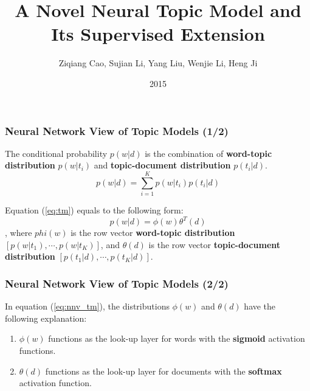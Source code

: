 \documentclass{beamer}
\begin{document}
\title{A Novel Neural Topic Model and Its Supervised Extension}
\author{Ziqiang Cao, Sujian Li, Yang Liu, Wenjie Li, Heng Ji}
\date{2015}
\maketitle

\begin{frame}
\frametitle{Neural Network View of Topic Models (1/2)}

The conditional probability \(p(w|d)\) is the combination of \textbf{word-topic distribution} \(p(w|t_i)\) and \textbf{topic-document distribution} \(p(t_i|d)\).
\begin{equation}
\label{eq:tm}
	p(w|d)=\sum_{i=1}^{K} p(w|t_i)p(t_i|d)
\end{equation}

Equation (\ref{eq:tm}) equals to the following form:
\begin{equation}
\label{eq:nnv_tm}
p(w|d)=\phi(w) \theta^T(d)
\end{equation}
, where \(phi(w)\) is the row vector \textbf{word-topic distribution} \([p(w|t_1), \cdots, p(w|t_K)]\), and \(\theta(d)\) is the row vector \textbf{topic-document distribution} \([p(t_1|d), \cdots, p(t_K|d)]\).

\end{frame}

\begin{frame}
\frametitle{Neural Network View of Topic Models (2/2)}

In equation (\ref{eq:nnv_tm}), the distributions \(\phi(w)\) and \(\theta(d)\) have the following explanation:
\begin{enumerate}
	\item \(\phi(w)\) functions as the look-up layer for words with the \textbf{sigmoid} activation functions.
	\item \(\theta(d)\) functions as the look-up layer for documents with the \textbf{softmax} activation function. 
\end{enumerate}	

\end{frame}

\end{document}
